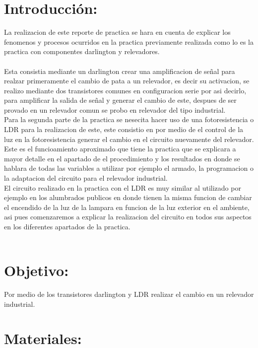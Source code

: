 \documentclass[12pt,a4paper]{article}
\begin{document}
\section{Introducción:}
La realizacion de este reporte de practica se hara en cuenta de explicar los fenomenos y procesos ocurridos en la practica previamente  realizada como lo es la practica con componentes darlington y relevadores.\\
\\
Esta consistia mediante un darlington crear una amplificacion de señal  para realzar primeramente el cambio de pata a un relevador, es decir su activacion, se realizo mediante dos transistores comunes en configuracion serie por asi decirlo, para amplificar la salida de señal y generar el cambio de este, despues de ser provado en un relevador comun se probo en relevador del tipo industrial.\\
Para la segunda parte de la practica se nesecita hacer uso de una fotoresistencia o LDR para la realizacion de este, este consistio en por medio de el control de la luz en la fotoresistencia generar el cambio en el circuito nuevamente del relevador.\\

Este es el funcioamiento aproximado que tiene la practica que se explicara a mayor detalle en el apartado de el procedimiento y los resultados en donde se hablara de todas las variables a utilizar por ejemplo el armado, la programacion o la adaptacion del circuito para el relevador industrial.\\
El circuito realizado en la practica con el LDR es muy similar al utilizado por ejemplo en los alumbrados publicos en donde tienen la misma funcion de cambiar el encendido de la luz  de la lampara en funcion de la luz exterior en el ambiente, asi pues comenzaremos a explicar la realizacion del circuito en todos sus aspectos en los diferentes apartados de la practica.\\\\  

\section{Objetivo:}
Por medio de los  transistores darlington y LDR realizar el cambio en un relevador industrial.\\

\section{Materiales:}
\end{document}
